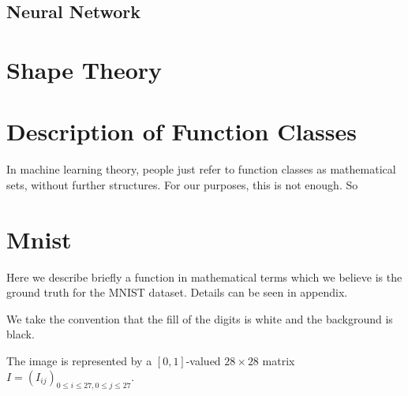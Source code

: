 \documentclass[11pt, oneside]{article}   	%
\theoremstyle{definition}
\begin{document}
\subsection{Neural Network}

\section{Shape Theory}


\appendix

\section{Description of Function Classes}

In machine learning theory, people just refer to function classes as mathematical sets, without further structures. For our purposes, this is not enough. So

\section{Mnist} 
Here we describe briefly a function in mathematical terms which we believe is the ground truth for the MNIST dataset. Details can be seen in appendix.

We take the convention that the fill of the digits is white and the background is black.

The image is represented by a $[0,1]$-valued $28\times 28$ matrix $I=(I_{ij})_{0\le i\le 27, 0\le j\le 27}$.
\end{document}
